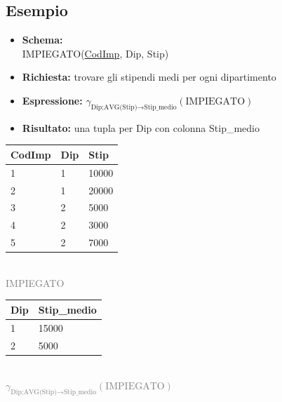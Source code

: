 \subsection{Esempio}
\begin{minipage}[t]{0.55\textwidth}
    \vspace{0pt} %
    \begin{itemize}
        \item \textbf{Schema:}\\[0.3cm]
        IMPIEGATO(\underline{CodImp}, Dip, Stip)
        
        \vspace{0.3cm}
        \item \textbf{Richiesta:} trovare gli stipendi medi per ogni dipartimento
        \item \textbf{Espressione:} $\gamma_{\text{Dip;AVG(Stip)}\rightarrow\text{Stip\_medio}}(\text{IMPIEGATO})$
        \item \textbf{Risultato:} una tupla per Dip con colonna Stip\_medio
    \end{itemize}
\end{minipage}%
\hfill
\begin{minipage}[t]{0.40\textwidth}
    \vspace{0pt} %
    \centering
    \renewcommand{\arraystretch}{1.5} %
    \begin{tabular}{|l|l|l|}
        \hline
        \textbf{CodImp} & \textbf{Dip} & \textbf{Stip} \\ \hline
        1 & 1 & 10000 \\ \hline
        2 & 1 & 20000 \\ \hline
        3 & 2 & 5000  \\ \hline
        4 & 2 & 3000  \\ \hline
        5 & 2 & 7000  \\ \hline
    \end{tabular}\\[0.2cm]
    \small \textcolor{gray}{IMPIEGATO}
\end{minipage}

\vspace{1.5cm}

\begin{minipage}{0.55\textwidth}
    \centering
    \renewcommand{\arraystretch}{1.5}
    \begin{tabular}{|l|l|}
        \hline
        \textbf{Dip} & \textbf{Stip\_medio} \\ \hline
        1 & 15000 \\ \hline
        2 & 5000  \\ \hline
    \end{tabular}\\[0.3cm]
    \small \textcolor{gray}{$\gamma_{\text{Dip;AVG(Stip)}\rightarrow\text{Stip\_medio}}(\text{IMPIEGATO})$}
\end{minipage}